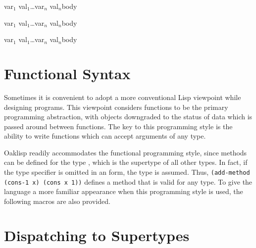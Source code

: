{\lpar\lpar var$_1$ val$_1$\rpar\ldots var$_n$ val$_n$\rpar \dt body}

{\lpar\lpar var$_1$ val$_1$\rpar\ldots var$_n$ val$_n$\rpar \dt body}

{\lpar\lpar var$_1$ val$_1$\rpar\ldots\lpar var$_n$ val$_n$\rpar\rpar \dt body}


\section{Functional Syntax}

Sometimes it is convenient to adopt a more conventional Lisp
viewpoint while designing programs.  This viewpoint considers functions
to be the primary programming abstraction, with objects downgraded to
the status of data which is passed around between functions. The key
to this programming style is the ability to write functions which can accept
arguments of any type.

Oaklisp readily accommodates the functional programming style, since
methods can be defined for the type , which is the
supertype of all other types.  In fact, if the type specifier is
omitted in an  form, the type  is assumed.
Thus, {\tt (add-method (\mbox{cons-1} x) (cons x 1))} defines a method that
is valid for any type.  To give the language a more familiar
appearance when this programming style is used, the following macros
are also provided.




\section{Dispatching to Supertypes}


